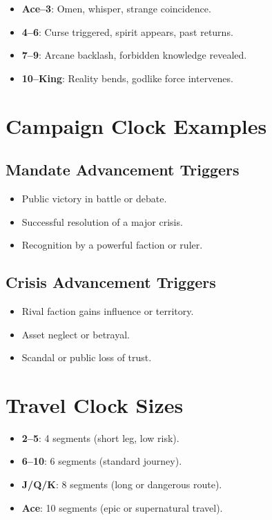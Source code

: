 \begin{itemize}
    \item \textbf{Ace–3}: Omen, whisper, strange coincidence.
    \item \textbf{4–6}: Curse triggered, spirit appears, past returns.
    \item \textbf{7–9}: Arcane backlash, forbidden knowledge revealed.
    \item \textbf{10–King}: Reality bends, godlike force intervenes.
\end{itemize}

\section*{Campaign Clock Examples}

\subsection*{Mandate Advancement Triggers}

\begin{itemize}
    \item Public victory in battle or debate.
    \item Successful resolution of a major crisis.
    \item Recognition by a powerful faction or ruler.
\end{itemize}

\subsection*{Crisis Advancement Triggers}

\begin{itemize}
    \item Rival faction gains influence or territory.
    \item Asset neglect or betrayal.
    \item Scandal or public loss of trust.
\end{itemize}

\section*{Travel Clock Sizes}

\begin{itemize}
    \item \textbf{2–5}: 4 segments (short leg, low risk).
    \item \textbf{6–10}: 6 segments (standard journey).
    \item \textbf{J/Q/K}: 8 segments (long or dangerous route).
    \item \textbf{Ace}: 10 segments (epic or supernatural travel).
\end{itemize}

